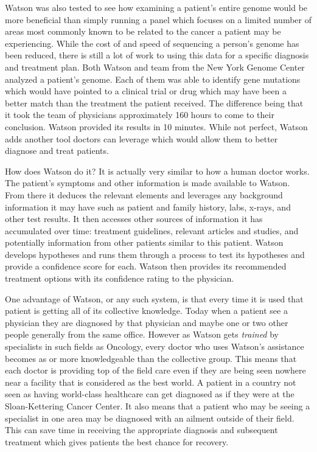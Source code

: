 \documentclass[sigconf]{acmart}
\begin{document}
Watson was also tested to see how examining a patient's entire genome would 
be more beneficial than simply running a panel which focuses on a limited 
number of areas most commonly known to be related to the cancer a patient 
may be experiencing.  While the cost of and speed of sequencing a person's 
genome has been reduced, there is still a lot of work to using this data 
for a specific diagnosis and treatment plan. Both Watson and team from the 
New York Genome Center analyzed a patient's genome.  Each of them was able 
to identify gene mutations which would have pointed to a clinical trial or 
drug which may have been a better match than the treatment the patient 
received.  The difference being that it took the team of physicians 
approximately 160 hours to come to their conclusion.  Watson provided its 
results in 10 minutes\cite{IEEESpectrum}.  While not perfect, Watson adds 
another tool doctors can leverage which would allow them to better diagnose 
and treat patients.

How does Watson do it?  It is actually very similar to how a human doctor 
works.  The patient's symptoms and other information is made available to 
Watson.  From there it deduces the relevant elements and leverages any 
background information it may have such as patient and family history, 
labs, x-rays, and other test results.  It then accesses other sources of 
information it has accumulated over time: treatment guidelines, relevant 
articles and studies, and potentially information from other patients 
similar to this patient.  Watson develops hypotheses and runs them through 
a process to test its hypotheses and provide a confidence score for each.  
Watson then provides its recommended treatment options with its confidence 
rating to the physician\cite{BusInsider}.

One advantage of Watson, or any such system, is that every time it is used 
that patient is getting all of its collective knowledge.  Today when a 
patient see a physician they are diagnosed by that physician and maybe 
one or two other people generally from the same office.  However as Watson 
gets \emph{trained} by specialists in such fields as Oncology, every doctor 
who uses Watson's assistance becomes as or more knowledgeable than the 
collective group.  This means that each doctor is providing top of the 
field care even if they are being seen nowhere near a facility that is 
considered as the best world\cite{FortuneTrans}.  A patient in a country 
not seen as having world-class healthcare can get diagnosed as if they were 
at the Sloan-Kettering Cancer Center.  It also means that a patient who may 
be seeing a specialist in one area may be diagnosed with an ailment outside 
of their field.  This can save time in receiving the appropriate diagnosis 
and subsequent treatment which gives patients the best chance for recovery.
\end{document}
